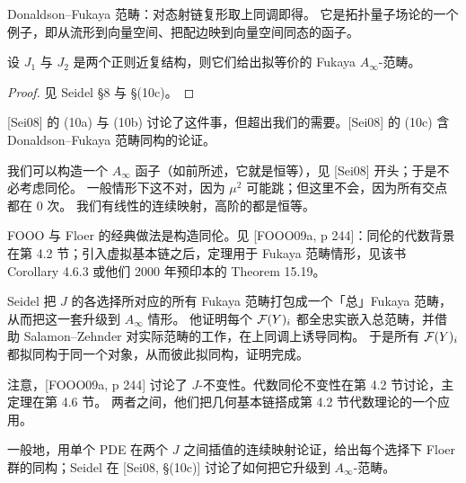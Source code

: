 \begin{definition}\label{c8:def-donaldson-fukaya}
Donaldson--Fukaya 范畴：对态射链复形取上同调即得。
它是拓扑量子场论的一个例子，即从流形到向量空间、把配边映到向量空间同态的函子。
\end{definition}

\begin{lemma}\label{c8:lem-J-indep}
设 $J_1$ 与 $J_2$ 是两个正则近复结构，则它们给出拟等价的 Fukaya $A_\infty$-范畴。
\end{lemma}

\begin{proof}
见 Seidel §8 与 §(10c)。
\end{proof}


\begin{remark}\label{c8:rem-indep-discussion}
[Sei08] 的 (10a) 与 (10b) 讨论了这件事，但超出我们的需要。[Sei08] 的 (10c) 含 Donaldson--Fukaya 范畴同构的论证。

我们可以构造一个 $A_\infty$ 函子（如前所述，它就是恒等），见 [Sei08] 开头；于是不必考虑同伦。
一般情形下这不对，因为 $\mu^2$ 可能跳；但这里不会，因为所有交点都在 $0$ 次。
我们有线性的连续映射，高阶的都是恒等。

FOOO 与 Floer 的经典做法是构造同伦。见 [FOOO09a, p 244]：同伦的代数背景在第 4.2 节；引入虚拟基本链之后，定理用于 Fukaya 范畴情形，见该书 Corollary 4.6.3 或他们 2000 年预印本的 Theorem 15.19。

Seidel 把 $J$ 的各选择所对应的所有 Fukaya 范畴打包成一个「总」Fukaya 范畴，从而把这一套升级到 $A_\infty$ 情形。
他证明每个 $\mathcal{F}(Y)_i$ 都全忠实嵌入总范畴，并借助 Salamon--Zehnder 对实际范畴的工作，在上同调上诱导同构。
于是所有 $\mathcal{F}(Y)_i$ 都拟同构于同一个对象，从而彼此拟同构，证明完成。

注意，[FOOO09a, p 244] 讨论了 $J$-不变性。代数同伦不变性在第 4.2 节讨论，主定理在第 4.6 节。
两者之间，他们把几何基本链搭成第 4.2 节代数理论的一个应用。

一般地，用单个 PDE 在两个 $J$ 之间插值的连续映射论证，给出每个选择下 Floer 群的同构；Seidel 在 [Sei08, §(10c)] 讨论了如何把它升级到 $A_\infty$-范畴。
\end{remark}


